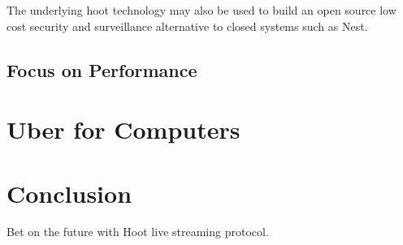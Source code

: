 \documentclass{article}
\begin{document}
The underlying hoot technology may also be used to build an open
source low cost security and surveillance alternative to closed systems
such as Nest.

\subsection{Focus on Performance}

\section{Uber for Computers}


\section{Conclusion}
Bet on the future with Hoot live streaming protocol.

\newpage





\end{document}
